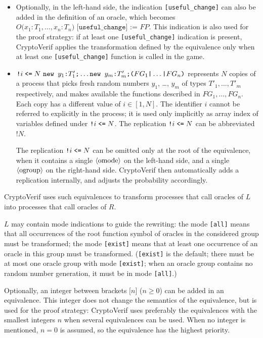 \begin{itemize}
\begin{itemize}
\item Optionally, in the left-hand side, 
the indication \texttt{[useful\_change]} can also
be added in the definition of an oracle, which becomes 
$O\texttt{(}x_1:T_1, \ldots, x_n:T_n\texttt{) [useful\_change] := }\mathit{FP}$.
This indication is also used for the proof strategy: 
if at least one \texttt{[useful\_change]} indication is present,
CryptoVerif applies the transformation defined by the equivalence
only when at least one \texttt{[useful\_change]} function is called in the game.

\item $\texttt{!} i \leqt  N\ \Resa{y_1}{T'_1}\texttt{;}
\ldots \Resa{y_m}{T'_m} \texttt{;} \texttt{(}FG_1\texttt{|} \ldots \texttt{|}
FG_n\texttt{)}$ represents $N$ copies of a process that picks fresh
random numbers $y_1$, \ldots, $y_m$ of types $T'_1, \ldots, T'_m$
respectively, and makes available the functions described in $FG_1,
\ldots, FG_n$. Each copy has a different value of $i \in [1, N]$. The
identifier $i$ cannot be referred to explicitly in the process; it is
used only implicitly as array index of variables defined under
$\texttt{!} i \mathrel{\texttt{<=}}  N$.  The replication $\texttt{!} i
\mathrel{\texttt{<=}}  N$ can be abbreviated $\texttt{!} N$.

The replication $\texttt{!} i \mathrel{\texttt{<=}}  N$ can be omitted 
only at the root of the equivalence, when it contains
a single $\langle\textrm{omode}\rangle$ on the left-hand side, and a single $\langle\textrm{ogroup}\rangle$
on the right-hand side. CryptoVerif then automatically
adds a replication internally, and adjusts the probability
accordingly.

\end{itemize}
CryptoVerif uses such equivalences to transform processes that call
oracles of $L$ into processes that call oracles of $R$.

$L$ may contain mode indications to guide the rewriting: the mode
\texttt{[all]} means that all occurrences of the root function symbol
of oracles in the considered group must be transformed;
the mode \texttt{[exist]} means that at least one occurrence of an
oracle in this group must be transformed. (\texttt{[exist]} is the default;
there must be at most one oracle group with mode \texttt{[exist]};
when an oracle group contains no random number generation, it must be in mode 
\texttt{[all]}.)

Optionally, 
an integer between brackets $\texttt{[}n\texttt{]}$ ($n \geq 0$)
can be added in an equivalence.
This integer does not change the semantics of the equivalence, but is
used for the proof strategy: CryptoVerif uses preferably the equivalences
with the smallest integers $n$ when several equivalences can be used.
When no integer is mentioned,
$n = 0$ is assumed, so the equivalence has the highest priority.


\end{itemize}
